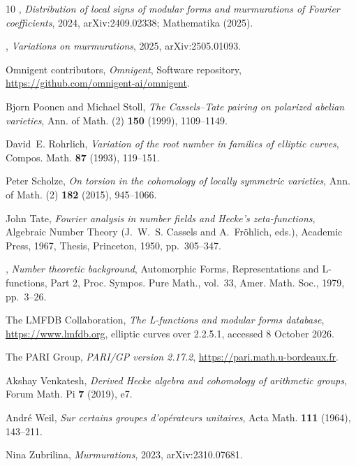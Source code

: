 \documentclass[11pt]{amsart}
\numberwithin{equation}{section}
\begin{document}
\begin{thebibliography}{10}
\bysame, \emph{Distribution of local signs of modular forms and murmurations of
  {F}ourier coefficients}, 2024, arXiv:2409.02338; Mathematika (2025).

\bysame, \emph{Variations on murmurations}, 2025, arXiv:2505.01093.

{Omnigent contributors}, \emph{Omnigent}, Software repository,
  \url{https://github.com/omnigent-ai/omnigent}.

Bjorn Poonen and Michael Stoll, \emph{The {C}assels--{T}ate pairing on
  polarized abelian varieties}, Ann. of Math. (2) \textbf{150} (1999),
  1109--1149.

David~E. Rohrlich, \emph{Variation of the root number in families of elliptic
  curves}, Compos. Math. \textbf{87} (1993), 119--151.

Peter Scholze, \emph{On torsion in the cohomology of locally symmetric
  varieties}, Ann. of Math. (2) \textbf{182} (2015), 945--1066.

John Tate, \emph{Fourier analysis in number fields and {H}ecke's
  zeta-functions}, Algebraic Number Theory (J.~W.~S. Cassels and
  A.~Fr{\"o}hlich, eds.), Academic Press, 1967, Thesis, Princeton, 1950,
  pp.~305--347.

\bysame, \emph{Number theoretic background}, Automorphic Forms, Representations
  and {L}-functions, Part 2, Proc. Sympos. Pure Math., vol.~33, Amer. Math.
  Soc., 1979, pp.~3--26.

{The LMFDB Collaboration}, \emph{The {L}-functions and modular forms database},
  \url{https://www.lmfdb.org}, elliptic curves over 2.2.5.1, accessed 8 October
  2026.

{The PARI Group}, \emph{{PARI/GP} version 2.17.2},
  \url{https://pari.math.u-bordeaux.fr}.

Akshay Venkatesh, \emph{Derived {H}ecke algebra and cohomology of arithmetic
  groups}, Forum Math. Pi \textbf{7} (2019), e7.

Andr{\'e} Weil, \emph{Sur certains groupes d'op{\'e}rateurs unitaires}, Acta
  Math. \textbf{111} (1964), 143--211.

Nina Zubrilina, \emph{Murmurations}, 2023, arXiv:2310.07681.

\end{thebibliography}
\end{document}
